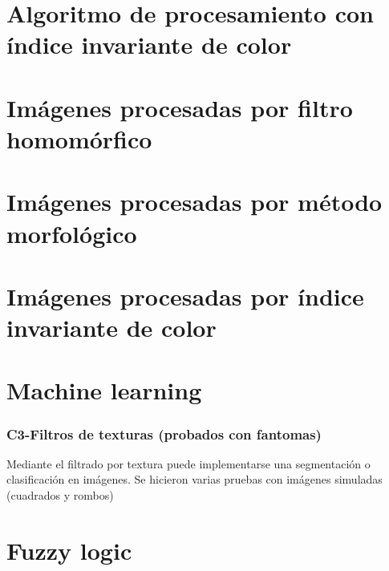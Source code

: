 \documentclass[11pt,a4paper]{report}
\begin{document}


\chapter{Algoritmo de procesamiento con índice invariante de color} 



\chapter{Imágenes procesadas por filtro homomórfico} \label{anexo_homo}
 
\chapter{Imágenes procesadas por método morfológico} \label{anexo_morfo}
 \chapter{Imágenes procesadas por índice invariante de color} \label{anexo_IIC}
 
\chapter{Machine learning} 
\subsection{C3-Filtros de texturas (probados con fantomas)} %
Mediante el filtrado por textura puede implementarse una segmentación o clasificación en imágenes. Se hicieron varias pruebas con imágenes simuladas (cuadrados y rombos)


\chapter{Fuzzy logic} 
    

	


\printbibliography[title={Referencias}, heading=bibintoc]
\end{document}

